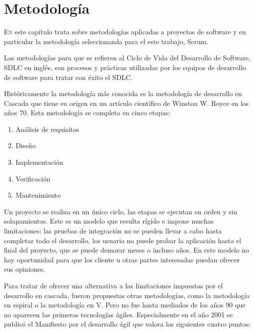 

\chapter{Metodología}
\label{chap:metodologia}

\lettrine{E}{n} este capítulo trata sobre metodologías aplicadas a proyectos de software y en particular la metodología seleccionanda para el este trabajo, Scrum.

Las metodologías para que se refieren al Ciclo de Vida del Desarrollo de Software, SDLC en inglés, son procesos y prácticas utilizadas por los equipos de desarrollo de software para tratar con éxito el SDLC.

Históricamente la metodología más conocida es la metodología de desarrollo en Cascada que tiene su origen en un artículo científico de Winston W. Royce en los años 70. Esta metodología se completa en cinco etapas:

\begin{enumerate}
    \item Análisis de requisitos
    \item Diseño
    \item Implementación
    \item Verificación
    \item Mantenimiento
\end{enumerate}

Un proyecto se realiza en un único ciclo,  las etapas se ejecutan en orden y sin solapamientos. Este es un modelo que resulta rígido e impone muchas limitaciones: las pruebas de integración no se pueden llevar a cabo hasta completar todo el desarrollo, los usuario no puede probar la aplicación hasta el final del proyecto, que se puede demorar meses o incluso años. En este modelo no hay oportunidad para que los cliente u otras partes interesadas puedan ofrecer sus opiniones.

Para tratar de ofrecer una alternativa a las limitaciones impuestas por el desarrollo en cascada, fueron propuestas otras metodologías, como la metodología en espiral o la metodología en V. Pero no fue hasta mediados de los años 90 que no aparecen las primeras tecnologías ágiles. Especialmente en el año 2001 se publicó el Manifiesto por el desarrollo ágil que valora los siguientes cuatro puntos:

